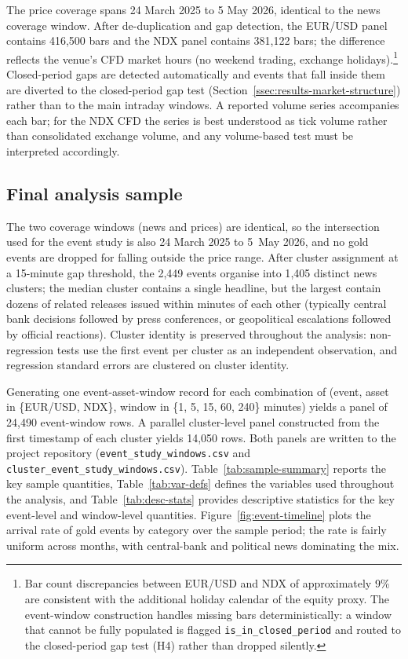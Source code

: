 The price coverage spans 24 March 2025 to 5 May 2026, identical to
the news coverage window. After de-duplication and gap detection,
the EUR/USD panel contains 416{,}500 bars and the NDX panel contains
381{,}122 bars; the difference reflects the venue's CFD market hours
(no weekend trading, exchange holidays).\footnote{Bar count
discrepancies between EUR/USD and NDX of approximately 9\% are
consistent with the additional holiday calendar of the equity
proxy. The event-window construction handles missing bars
deterministically: a window that cannot be fully populated is
flagged \texttt{is\_in\_closed\_period} and routed to the
closed-period gap test (H4) rather than dropped silently.} Closed-period gaps are
detected automatically and events that fall inside them are diverted
to the closed-period gap test
(Section~\ref{ssec:results-market-structure}) rather than to the
main intraday windows. A reported volume series accompanies each
bar; for the NDX CFD the series is best understood as tick volume
rather than consolidated exchange volume, and any volume-based test
must be interpreted accordingly.

\subsection{Final analysis sample}
\label{ssec:final-sample}

The two coverage windows (news and prices) are identical, so the
intersection used for the event study is also 24 March 2025 to
5~May 2026, and no gold events are dropped for falling outside the
price range. After cluster assignment at a 15-minute gap threshold,
the 2{,}449 events organise into 1{,}405 distinct news clusters;
the median cluster contains a single headline, but the largest
contain dozens of related releases issued within minutes of each
other (typically central bank decisions followed by press
conferences, or geopolitical escalations followed by official
reactions). Cluster identity is preserved throughout the analysis:
non-regression tests use the first event per cluster as an
independent observation, and regression standard errors are
clustered on cluster identity.

Generating one event-asset-window record for each combination of
(event, asset in \{EUR/USD, NDX\}, window in
\{1, 5, 15, 60, 240\} minutes) yields a panel of 24{,}490
event-window rows. A parallel cluster-level panel constructed from
the first timestamp of each cluster yields 14{,}050 rows. Both panels
are written to the project repository (\texttt{event\_study\_windows.csv}
and \texttt{cluster\_event\_study\_windows.csv}).
Table~\ref{tab:sample-summary} reports the key sample quantities,
Table~\ref{tab:var-defs} defines the variables used throughout the
analysis, and Table~\ref{tab:desc-stats} provides descriptive
statistics for the key event-level and window-level quantities.
Figure~\ref{fig:event-timeline} plots the arrival rate of gold
events by category over the sample period; the rate is fairly
uniform across months, with central-bank and political news
dominating the mix.

